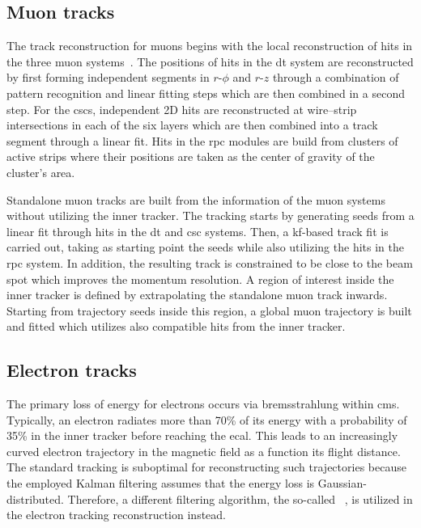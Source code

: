\subsection{Muon tracks}
\label{sec:reconstruction-muontracks}

The track reconstruction for muons begins with the local reconstruction of hits in the three muon systems~\cite{Bayatian:922757}. The positions of hits in the \gls{dt} system are reconstructed by first forming independent segments in $r\text{-}\phi$ and $r\text{-}z$ through a combination of pattern recognition and linear fitting steps which are then combined in a second step. For the \glspl{csc}, independent 2D hits are reconstructed at wire--strip intersections in each of the six layers which are then combined into a track segment through a linear fit. Hits in the \gls{rpc} modules are build from clusters of active strips where their positions are taken as the center of gravity of the cluster's area.

Standalone muon tracks are built from the information of the muon systems without utilizing the inner tracker. The tracking starts by generating seeds from a linear fit through hits in the \gls{dt} and \gls{csc} systems. Then, a \gls{kf}-based track fit is carried out, taking as starting point the seeds while also utilizing the hits in the \gls{rpc} system. In addition, the resulting track is constrained to be close to the beam spot which improves the momentum resolution. A region of interest inside the inner tracker is defined by extrapolating the standalone muon track inwards. Starting from trajectory seeds inside this region, a global muon trajectory is built and fitted which utilizes also compatible hits from the inner tracker.


\subsection{Electron tracks}
\label{sec:reconstruction-electrontracks}

The primary loss of energy for electrons occurs via bremsstrahlung within \gls{cms}. Typically, an electron radiates more than 70\% of its energy with a probability of 35\% in the inner tracker before reaching the \gls{ecal}. This leads to an increasingly curved electron trajectory in the magnetic field as a function its flight distance. The standard tracking is suboptimal for reconstructing such trajectories because the employed Kalman filtering assumes that the energy loss is Gaussian-distributed. Therefore, a different filtering algorithm, the so-called ~\cite{0954-3899-31-9-N01}, is utilized in the electron tracking reconstruction instead.

